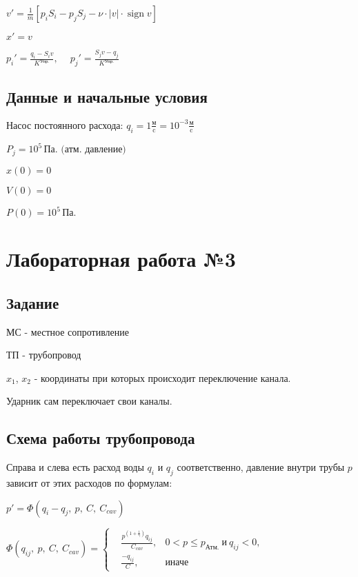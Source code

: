 \documentclass[12pt, a4paper]{article}
\DeclareMathOperator{\sign}{sign}
\begin{document}
$ v' = \frac{1}{m}[p_i S_i - p_j S_j - \nu \cdot |v| \cdot \sign v] $

$ x' = v $

$ p_i' = \frac{q_i - S_i v}{K^{\text{Упр.}}},\ \quad p_j' = \frac{S_j v - q_j}{K^{\text{Упр.}}}$


\subsection{Данные и начальные условия}

$\text{Насос постоянного расхода: } q_i = 1 \frac{\text{м}}{\text{c}} = 10^{-3} \frac{\text{м}}{\text{c}}$

$P_j = 10^5\, \text{Па. (атм. давление)}$

$ x(0) = 0$

$ V(0) = 0$

$ P(0) = 10^5\, \text{Па.} $


\section{Лабораторная работа №3}

\subsection{Задание}

МС - местное сопротивление

ТП - трубопровод

$x_1$, $x_2$ - координаты при которых происходит переключение канала.

Ударник сам переключает свои каналы.

\subsection{Схема работы трубопровода}

Справа и слева есть расход воды $q_i$ и $q_j$ соответственно, давление внутри трубы $p$ зависит от этих расходов по формулам:

$ p' = \Phi(q_i - q_j,\ p,\ C,\ C_{cav}) $

$
\Phi(q_{ij},\ p,\ C,\ C_{cav}) = \left\{
\begin{aligned}
&\frac{p^{\left(1+\frac{1}{\gamma}\right)}q_{ij}}{C_{cav}},  & 0 < p \leqslant p_{\text{Атм.}}\ \text{и} \ q_{ij} < 0, \\
& \frac{-q_{ij}}{C}, & \text{иначе}
\end{aligned}
\right.
$
\end{document}
